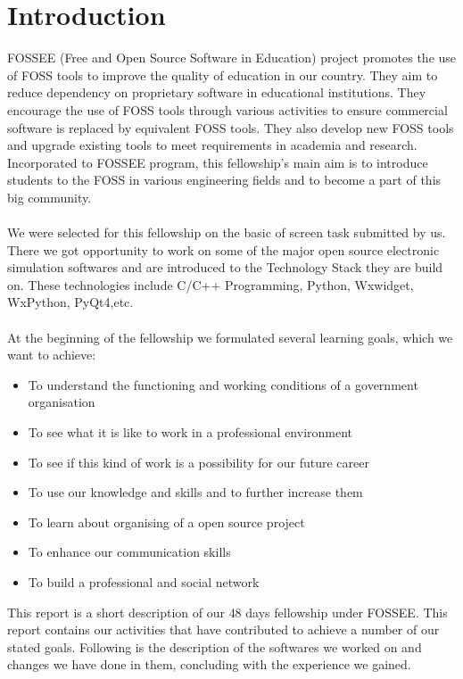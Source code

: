 \documentclass[12pt,a4paper]{report}
\begin{document}
\chapter{\textbf{Introduction}}
FOSSEE (Free and Open Source Software in Education) project promotes the use of FOSS tools to improve the quality of education in our country. They aim to reduce dependency on proprietary software in educational institutions. They encourage the use of FOSS tools through various activities to ensure commercial software is replaced by equivalent FOSS tools. They also develop new FOSS tools and upgrade existing tools to meet requirements in academia and research. 
Incorporated to FOSSEE program, this fellowship's main aim is to introduce students to the FOSS in various engineering fields and to become a part of this big community.
\\\\
We were selected for this fellowship on the basic of screen task submitted by us. There we got opportunity to work on some of the major open source electronic simulation softwares and are introduced to the Technology Stack they are build on. These technologies include C/C++ Programming, Python, Wxwidget, WxPython, PyQt4,etc. 
\\\\
At the beginning of the fellowship we formulated several learning goals, which we want to achieve:
\begin{itemize}
	\item To understand the functioning and working conditions of a government organisation
	\item To see what it is like to work in a professional environment
	\item To see if this kind of work is a possibility for our future career
	\item To use our knowledge and skills and to further increase them
	\item To learn about organising of a open source project
	\item To enhance our communication skills
	\item To build a professional and social network
\end{itemize}
This report is a short description of our 48 days fellowship under FOSSEE. This report contains our activities that have contributed to achieve a number of our stated goals. Following is the description of the softwares we worked on and changes we have done in them, concluding with the experience we gained.
\end{document}
